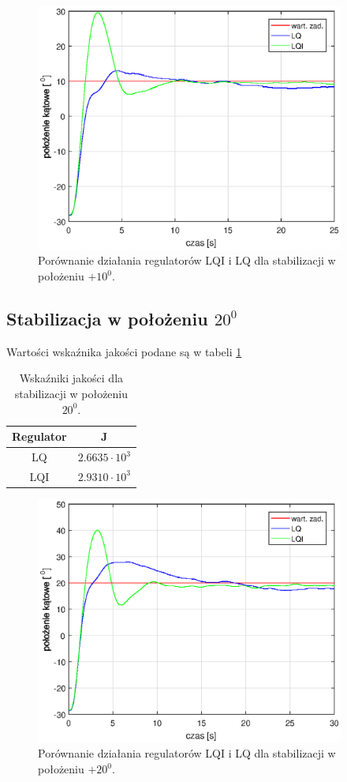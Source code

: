 \documentclass[11pt,a4paper]{article}
\begin{document}
\begin{figure}[H]
	\centering
	\includegraphics[width=4in]{Figures/por_LQ18.eps}
	\caption{Porównanie działania regulatorów LQI i LQ dla stabilizacji w położeniu $+10 ^0$.}
	\label{fig:por_LQ10}
\end{figure}

\subsection{Stabilizacja w położeniu $20^0$}

Wartości wska\'znika jakości podane są w tabeli \ref{por_reg_20_tab}

\begin{table}[h]
	\caption{Wska\'zniki jakości dla stabilizacji w położeniu $20^0$.}
	\label{por_reg_20_tab}
	\centering
	
	\begin{tabular}{|c|c|}
		\hline
		Regulator &J\\
		\hline
		LQ & $2.6635 \cdot 10 ^3$\\
		\hline
		LQI & $2.9310 \cdot 10 ^3$\\
		\hline
	\end{tabular}
\end{table}

\begin{figure}[H]
	\centering
	\includegraphics[width=4in]{Figures/por_LQ9.eps}
	\caption{Porównanie działania regulatorów LQI i LQ dla stabilizacji w położeniu $+20 ^0$.}
	\label{fig:por_LQ20}
\end{figure}
\end{document}
